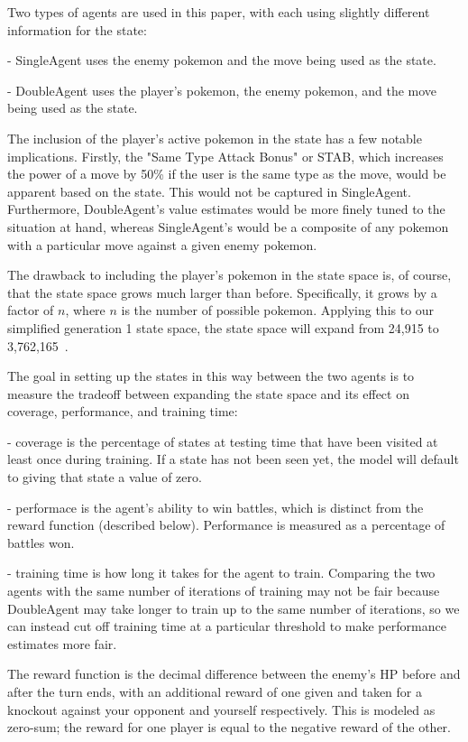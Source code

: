 \documentclass{article}
\begin{document}
\quad	Two types of agents are used in this paper, with each using slightly different information for the state:

\quad	- SingleAgent uses the enemy pokemon and the move being used as the state.

\quad	- DoubleAgent uses the player's pokemon, the enemy pokemon, and the move being used as the state.

\quad	The inclusion of the player's active pokemon in the state has a few notable implications. Firstly, the "Same Type Attack Bonus" or STAB, which increases the power of a move by 50\% if the user is the same type as the move, would be apparent based on the state. This would not be captured in SingleAgent. Furthermore, DoubleAgent's value estimates would be more finely tuned to the situation at hand, whereas SingleAgent's would be a composite of any pokemon with a particular move against a given enemy pokemon.

\quad	The drawback to including the player's pokemon in the state space is, of course, that the state space grows much larger than before. Specifically, it grows by a factor of $n$, where $n$ is the number of possible pokemon. Applying this to our simplified generation 1 state space, the state space will expand from 24,915 to 3,762,165~\citep{PokemonWiki}.

\quad	The goal in setting up the states in this way between the two agents is to measure the tradeoff between expanding the state space and its effect on coverage, performance, and training time:

\quad\quad	- coverage is the percentage of states at testing time that have been visited at least once during training. If a state has not been seen yet, the model will default to giving that state a value of zero.

\quad\quad	- performace is the agent's ability to win battles, which is distinct from the reward function (described below). Performance is measured as a percentage of battles won.

\quad\quad	- training time is how long it takes for the agent to train. Comparing the two agents with the same number of iterations of training may not be fair because DoubleAgent may take longer to train up to the same number of iterations, so we can instead cut off training time at a particular threshold to make performance estimates more fair.

\quad	The reward function is the decimal difference between the enemy's HP before and after the turn ends, with an additional reward of one given and taken for a knockout against your opponent and yourself respectively. This is modeled as zero-sum; the reward for one player is equal to the negative reward of the other.
\end{document}
